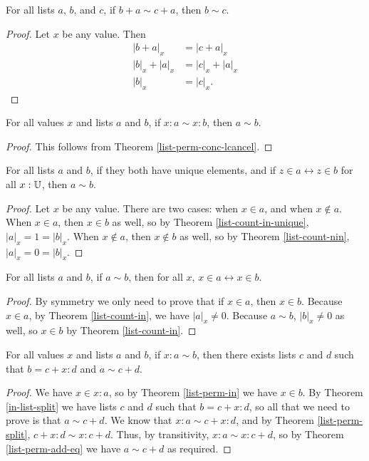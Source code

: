 \documentclass[../math.tex]{subfiles}
\begin{document}
\begin{theorem} \label{list-perm-conc-rcancel}
    For all lists $a$, $b$, and $c$, if $b + a \sim c + a$, then $b \sim c$.
\end{theorem}
\begin{proof}
    Let $x$ be any value.  Then
    \begin{align*}
        |b + a|_x &= |c + a|_x \\
        |b|_x + |a|_x &= |c|_x + |a|_x \\
        |b|_x &= |c|_x.
    \end{align*}
\end{proof}

\begin{theorem} \label{list-perm-add-eq}
    For all values $x$ and lists $a$ and $b$, if $x : a \sim x : b$, then $a
    \sim b$.
\end{theorem}
\begin{proof}
    This follows from Theorem \ref{list-perm-conc-lcancel}.
\end{proof}

\begin{theorem} \label{list-in-unique-perm}
    For all lists $a$ and $b$, if they both have unique elements, and if $z \in
    a \leftrightarrow z \in b$ for all $x : \mathbb{U}$, then $a \sim b$.
\end{theorem}
\begin{proof}
    Let $x$ be any value.  There are two cases: when $x \in a$, and when $x
    \notin a$.  When $x \in a$, then $x \in b$ as well, so by Theorem
    \ref{list-count-in-unique}, $|a|_x = 1 = |b|_x$.  When $x \notin a$, then $x
    \notin b$ as well, so by Theorem \ref{list-count-nin}, $|a|_x = 0 = |b|_x$.
\end{proof}

\begin{theorem} \label{list-perm-in}
    For all lists $a$ and $b$, if $a \sim b$, then for all $x$, $x \in a
    \leftrightarrow x \in b$.
\end{theorem}
\begin{proof}
    By symmetry we only need to prove that if $x \in a$, then $x \in b$.
    Because $x \in a$, by Theorem \ref{list-count-in}, we have $|a|_x \neq 0$.
    Because $a \sim b$, $|b|_x \neq 0$ as well, so $x \in b$ by Theorem
    \ref{list-count-in}.
\end{proof}

\begin{theorem} \label{list-perm-split-eq}
    For all values $x$ and lists $a$ and $b$, if $x : a \sim b$, then there
    exists lists $c$ and $d$ such that $b = c + x : d$ and $a \sim c + d$.
\end{theorem}
\begin{proof}
    We have $x \in x : a$, so by Theorem \ref{list-perm-in} we have $x \in b$.
    By Theorem \ref{in-list-split} we have lists $c$ and $d$ such that $b = c +
    x : d$, so all that we need to prove is that $a \sim c + d$.  We know that
    $x : a \sim c + x : d$, and by Theorem \ref{list-perm-split}, $c + x : d
    \sim x : c + d$.  Thus, by transitivity, $x : a \sim x : c + d$, so by
    Theorem \ref{list-perm-add-eq} we have $a \sim c + d$ as required.
\end{proof}
\end{document}
